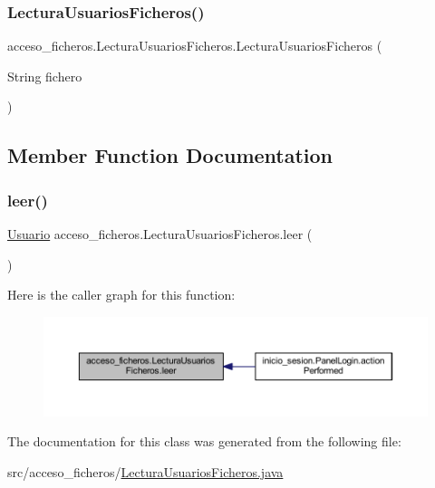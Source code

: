 \subsubsection{\texorpdfstring{Lectura\+Usuarios\+Ficheros()}{LecturaUsuariosFicheros()}}
{\footnotesize\ttfamily acceso\+\_\+ficheros.\+Lectura\+Usuarios\+Ficheros.\+Lectura\+Usuarios\+Ficheros (\begin{DoxyParamCaption}\item[{String}]{fichero }\end{DoxyParamCaption})}



\subsection{Member Function Documentation}
\mbox{\label{classacceso__ficheros_1_1_lectura_usuarios_ficheros_abfbad1424c327ef59fdfc5f9d9b80d3a}} 
\subsubsection{\texorpdfstring{leer()}{leer()}}
{\footnotesize\ttfamily \mbox{\hyperlink{classclases_1_1_usuario}{Usuario}} acceso\+\_\+ficheros.\+Lectura\+Usuarios\+Ficheros.\+leer (\begin{DoxyParamCaption}{ }\end{DoxyParamCaption})}

Here is the caller graph for this function\+:
\nopagebreak
\begin{figure}[H]
\begin{center}
\leavevmode
\includegraphics[width=350pt]{classacceso__ficheros_1_1_lectura_usuarios_ficheros_abfbad1424c327ef59fdfc5f9d9b80d3a_icgraph}
\end{center}
\end{figure}


The documentation for this class was generated from the following file\+:\begin{DoxyCompactItemize}
\item 
src/acceso\+\_\+ficheros/\mbox{\hyperlink{_lectura_usuarios_ficheros_8java}{Lectura\+Usuarios\+Ficheros.\+java}}\end{DoxyCompactItemize}
